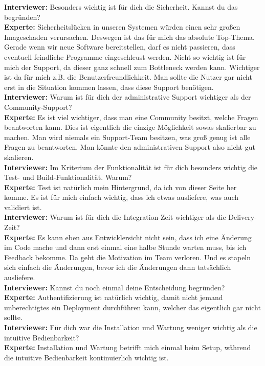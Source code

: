\begin{center}
\begin{figure}[H]
    \centering
    \label{fig:CEA}
\end{figure}	
\end{center}
\newpage
\resetlinenumber
\begin{linenumbers}
    \textbf{Interviewer:} Besonders wichtig ist für dich die Sicherheit. Kannst du das begründen?\\
    \textbf{Experte:} Sicherheitslücken in unseren Systemen würden einen sehr großen Imageschaden verursachen. Deswegen ist das für mich das absolute Top-Thema. Gerade wenn wir neue Software bereitstellen, darf es nicht passieren, dass eventuell feindliche Programme eingeschleust werden. Nicht so wichtig ist für mich der Support, da dieser ganz schnell zum Bottleneck werden kann. Wichtiger ist da für mich z.B. die Benutzerfreundlichkeit. Man sollte die Nutzer gar nicht erst in die Situation kommen lassen, dass diese Support benötigen.\\
    \textbf{Interviewer:} Warum ist für dich der administrative Support wichtiger als der Community-Support?\\
    \textbf{Experte:} Es ist viel wichtiger, dass man eine Community besitzt, welche Fragen beantworten kann. Dies ist eigentlich die einzige Möglichkeit sowas skalierbar zu machen. Man wird niemals ein Support-Team besitzen, was groß genug ist alle Fragen zu beantworten. Man könnte den administrativen Support also nicht gut skalieren.\\
    \textbf{Interviewer:} Im Kriterium der Funktionalität ist für dich besonders wichtig die Test- und Build-Funktionalität. Warum?\\
    \textbf{Experte:} Test ist natürlich mein Hintergrund, da ich von dieser Seite her komme. Es ist für mich einfach wichtig, dass ich etwas ausliefere, was auch validiert ist.\\
    \textbf{Interviewer:} Warum ist für dich die Integration-Zeit wichtiger als die Delivery-Zeit?\\
    \textbf{Experte:} Es kann eben aus Entwicklersicht nicht sein, dass ich eine Änderung im Code mache und dann erst einmal eine halbe Stunde warten muss, bis ich Feedback bekomme. Da geht die Motivation im Team verloren. Und es stapeln sich einfach die Änderungen, bevor ich die Änderungen dann tatsächlich ausliefere.\\
    \textbf{Interviewer:} Kannst du noch einmal deine Entscheidung begründen?\\
    \textbf{Experte:} Authentifizierung ist natürlich wichtig, damit nicht jemand unberechtigtes ein Deployment durchführen kann, welcher das eigentlich gar nicht sollte.\\
    \textbf{Interviewer:} Für dich war die Installation und Wartung weniger wichtig als die intuitive Bedienbarkeit?\\
    \textbf{Experte:} Installation und Wartung betrifft mich einmal beim Setup, während die intuitive Bedienbarkeit kontinuierlich wichtig ist.\\
\end{linenumbers}



